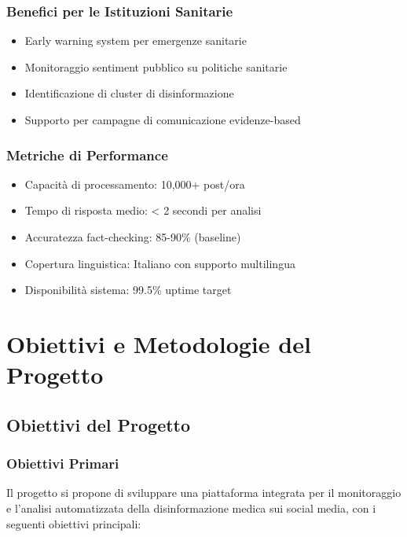 \documentclass[12pt,a4paper]{report}
\begin{document}
\subsection{Benefici per le Istituzioni Sanitarie}
\begin{itemize}
    \item Early warning system per emergenze sanitarie
    \item Monitoraggio sentiment pubblico su politiche sanitarie
    \item Identificazione di cluster di disinformazione
    \item Supporto per campagne di comunicazione evidenze-based
\end{itemize}

\subsection{Metriche di Performance}
\begin{itemize}
    \item Capacità di processamento: 10,000+ post/ora
    \item Tempo di risposta medio: < 2 secondi per analisi
    \item Accuratezza fact-checking: 85-90\% (baseline)
    \item Copertura linguistica: Italiano con supporto multilingua
    \item Disponibilità sistema: 99.5\% uptime target
\end{itemize}

\chapter{Obiettivi e Metodologie del Progetto}

\section{Obiettivi del Progetto}

\subsection{Obiettivi Primari}

Il progetto si propone di sviluppare una piattaforma integrata per il monitoraggio e l'analisi automatizzata della disinformazione medica sui social media, con i seguenti obiettivi principali:
\end{document}
